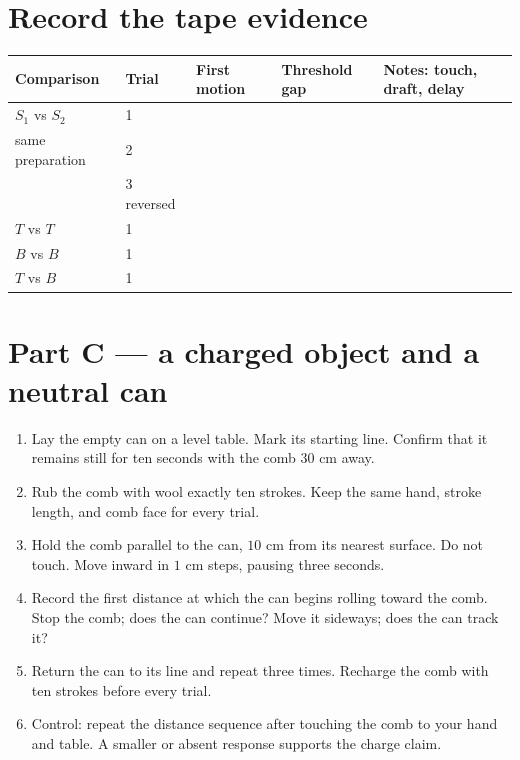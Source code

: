\section{Record the tape evidence}

\begin{center}\small
\begin{tabularx}{\linewidth}{@{}p{.18\linewidth}p{.13\linewidth}p{.13\linewidth}p{.17\linewidth}L@{}}
\toprule
Comparison & Trial & First motion & Threshold gap & Notes: touch, draft, delay\\
\midrule
\(S_1\) vs \(S_2\) & 1 & & & \\[1.25em]
same preparation & 2 & & & \\[1.25em]
 & 3 reversed & & & \\[1.25em]
\midrule
\(T\) vs \(T\) & 1 & & & \\[1.25em]
\(B\) vs \(B\) & 1 & & & \\[1.25em]
\(T\) vs \(B\) & 1 & & & \\[1.25em]
\bottomrule
\end{tabularx}
\end{center}

\newpage
{}
\section{Part C --- a charged object and a neutral can}

\begin{enumerate}
  \item Lay the empty can on a level table. Mark its starting line. Confirm
    that it remains still for ten seconds with the comb \(30\) cm away.
  \item Rub the comb with wool exactly ten strokes. Keep the same hand, stroke
    length, and comb face for every trial.
  \item Hold the comb parallel to the can, \(10\) cm from its nearest surface.
    Do not touch. Move inward in \(1\) cm steps, pausing three seconds.
  \item Record the first distance at which the can begins rolling toward the
    comb. Stop the comb; does the can continue? Move it sideways; does the can
    track it?
  \item Return the can to its line and repeat three times. Recharge the comb
    with ten strokes before every trial.
  \item Control: repeat the distance sequence after touching the comb to your
    hand and table. A smaller or absent response supports the charge claim.
\end{enumerate}

